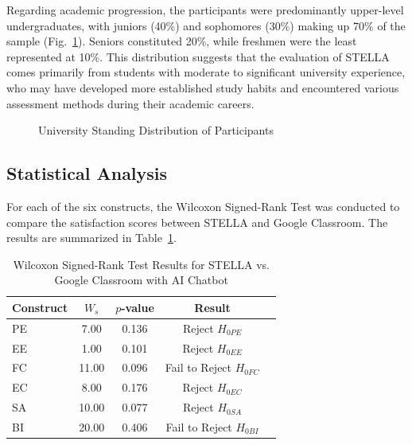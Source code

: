 \documentclass[sigconf,natbib=true]{acmart}
\begin{document}
Regarding academic progression, the participants were predominantly upper-level undergraduates, with juniors (40\%) and sophomores (30\%) making up 70\% of the sample (Fig.~\ref{fig:standing}). Seniors constituted 20\%, while freshmen were the least represented at 10\%. This distribution suggests that the evaluation of STELLA comes primarily from students with moderate to significant university experience, who may have developed more established study habits and encountered various assessment methods during their academic careers.

\begin{figure}[h]
  \centering
  \caption{University Standing Distribution of Participants}
  \label{fig:standing}
\end{figure}

\subsection{Statistical Analysis}
For each of the six constructs, the Wilcoxon Signed-Rank Test was
conducted to compare the satisfaction scores between STELLA and Google Classroom. The results are summarized in Table~\ref{tab:results}.

\begin{table}
  \caption{Wilcoxon Signed-Rank Test Results for STELLA vs. Google Classroom with AI Chatbot}\label{tab:results}
  \begin{tabular}{lcccc}
    \toprule
    Construct & $W_s$ & $p$-value & Result \\
    \midrule
    PE & 7.00 & 0.136 & Reject $H_{0PE}$ \\
    EE & 1.00 & 0.101 & Reject $H_{0EE}$ \\
    FC & 11.00 & 0.096 & Fail to Reject $H_{0FC}$ \\
    EC & 8.00 & 0.176 & Reject $H_{0EC}$ \\
    SA & 10.00 & 0.077 & Reject $H_{0SA}$ \\
    BI & 20.00 & 0.406 & Fail to Reject $H_{0BI}$ \\
    \bottomrule
  \end{tabular}
\end{table}
\end{document}
